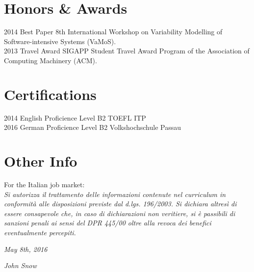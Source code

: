 \documentclass[]{friggeri-cv}
\begin{document}
\section{Honors \& Awards}
\begin{entrylist}
\entry
{2014}
{Best Paper}
{8th International Workshop on Variability Modelling of Software-intensive Systems (VaMoS).}\\
\entry
{2013}
{Travel Award}
{SIGAPP Student Travel Award Program of the Association of Computing Machinery (ACM).}\\
\end{entrylist}

\section{Certifications}
\begin{entrylist}
 \entry
 {2014}
 {English Proficience Level B2}
 {TOEFL ITP}\\
 
 \entry
 {2016}
 {German Proficience Level B2}
 {Volkshochschule Passau}\\
\end{entrylist}

\section{Other Info}
For the Italian job market:\\
\emph{Si autorizza il trattamento delle informazioni contenute nel curriculum in conformità alle disposizioni previste dal d.lgs. 196/2003. Si dichiara altresì di essere consapevole che, in caso di dichiarazioni non veritiere, si è passibili di sanzioni penali ai sensi del DPR 445/00 oltre alla revoca dei benefici eventualmente percepiti.}
\\
\begin{flushleft}
\emph{May 8th, 2016}
\end{flushleft}
\begin{flushright}
\emph{John Snow}
\end{flushright}
\end{document}
